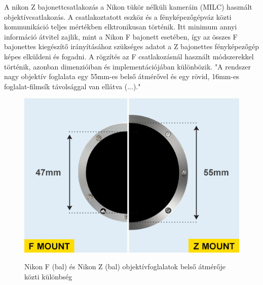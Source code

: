 A nikon Z bajonettcsatlakozás a Nikon tükör nélküli kameráin (MILC) használt objektívcsatlakozás. A csatlakoztatott eszköz és a fényképezőgépváz közti kommunikáció teljes mértékben elktronikusan történik. Itt minimum annyi információ átvitel zajlik, mint a Nikon F bajonett esetében, így az összes F bajonettes kiegészítő irányításához szükséges adatot a Z bajonettes fényképezőgép képes elküldeni és fogadni. A rögzítés az F csatlakozásnál használt módszerekkel történik, azonban dimenzióiban és implementációjában különbözik. "A rendszer nagy objektív foglalata egy 55mm-es belső átmérővel és egy rövid, 16mm-es foglalat-filmsík távolsággal van ellátva (...)."\cite{Nikon_Z}

\begin{figure}[H]
	\centering
	\includegraphics[width=0.5\linewidth]{img/F-mount-vs-Z-mount-illustration.jpg}
    \cite{Nikon_Z}
	\caption{Nikon F (bal) és Nikon Z (bal) objektívfoglalatok belső átmérője közti különbség}
	\label{fig:F_vs_Z_meret}
\end{figure}